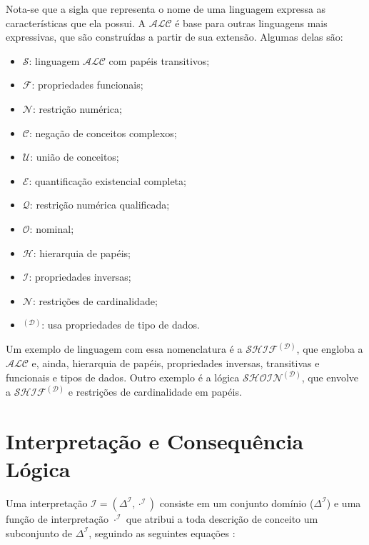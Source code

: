 Nota-se que a sigla que representa o nome de uma linguagem expressa as características que ela possui.
A $ \mathcal{ALC} $ é base para outras linguagens mais expressivas, que são construídas a partir de sua extensão. Algumas delas são:

\begin{itemize}
	\item $ \mathcal{S} $: linguagem $ \mathcal{ALC} $ com papéis transitivos;
	\item $ \mathcal{F} $: propriedades funcionais;
	\item $ \mathcal{N} $: restrição numérica;
	\item $ \mathcal{C} $: negação de conceitos complexos;
	\item $ \mathcal{U} $: união de conceitos;
	\item $ \mathcal{E} $: quantificação existencial completa;
	\item $ \mathcal{Q} $: restrição numérica qualificada;
	\item $ \mathcal{O} $: nominal;
	\item $ \mathcal{H} $: hierarquia de papéis;
	\item $ \mathcal{I} $: propriedades inversas;
	\item $ \mathcal{N} $: restrições de cardinalidade;
	\item $ ^\mathcal{(D)} $: usa propriedades de tipo de dados.
\end{itemize}

Um exemplo de linguagem com essa nomenclatura é a $ \mathcal{SHIF}^\mathcal{(D)} $, que engloba a $ \mathcal{ALC} $ e, ainda, hierarquia de papéis, propriedades inversas, transitivas e funcionais e tipos de dados. Outro exemplo é a lógica $ \mathcal{SHOIN}^\mathcal{(D)}$, que envolve a  $ \mathcal{SHIF}^\mathcal{(D)} $ e restrições de cardinalidade em papéis.

\section{Interpretação e Consequência Lógica}

Uma interpretação $ \mathcal{I} = (\Delta^{\mathcal{I}}, \cdot^{\mathcal{I}})$ consiste em um conjunto domínio ($ \Delta^{\mathcal{I}} $) e uma função de interpretação $ \cdot^{\mathcal{I}} $ que atribui a toda descrição de conceito um subconjunto de $ \Delta^{\mathcal{I}} $, seguindo as seguintes equações \citep{logicaHorrocks}:


